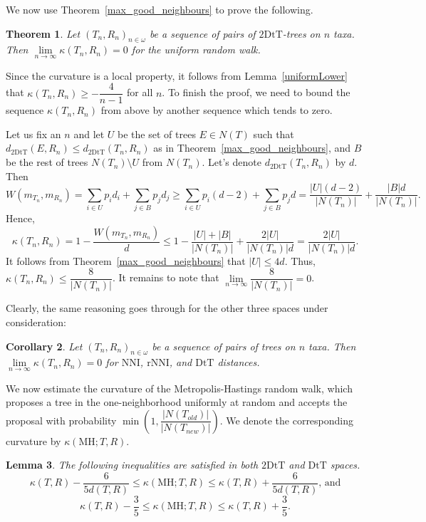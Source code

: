 \documentclass{amsart}
\newtheorem{lemma}{Lemma}
\newtheorem{corollary}[lemma]{Corollary}
\newtheorem{theorem}[lemma]{Theorem}
\theoremstyle{definition}
\newcommand{\dts}{\mathrm{2DtT}}
\newcommand{\nni}{\mathrm{NNI}}
\newcommand{\rnni}{\mathrm{rNNI}}
\newcommand{\mdts}{\mathrm{DtT}}
\newcommand{\MH}{\mathrm{MH}}
\begin{document}
We now use Theorem~\ref{max_good_neighbours} to prove the following.


\begin{theorem}\label{zero-in-the-limit}
Let $(T_n,R_n)_{n\in\omega}$ be a sequence of pairs of $\dts$-trees on $n$ taxa.
Then $\lim\limits_{n \to \infty}\kappa(T_n,R_n) = 0$ for the uniform random walk.
\end{theorem}

\proof
Since the curvature is a local property, it follows from Lemma~\ref{uniformLower} that $\kappa(T_n,R_n) \geq -\dfrac{4}{n-1}$ for all $n$.
To finish the proof, we need to bound the sequence $\kappa(T_n,R_n)$ from above by another sequence which tends to zero.

Let us fix an $n$ and let $U$ be the set of trees $E \in N(T)$ such that $d_\dts(E,R_n) \leq d_\dts(T_n,R_n)$ as in Theorem~\ref{max_good_neighbours}, and $B$ be the rest of trees $N(T_n)\setminus U$ from $N(T_n)$.
Let's denote $d_\dts(T_n,R_n)$ by $d$.
Then
\[
W(m_{T_n},m_{R_n}) = \sum_{i\in U} p_i d_i + \sum_{j\in B} p_j d_j \geq
\sum_{i\in U} p_i (d-2) + \sum_{j\in B} p_j d =
\frac{|U|(d-2)}{|N(T_n)|} + \frac{|B|d}{|N(T_n)|}.
\]
Hence,
\[
\kappa(T_n,R_n) = 1 - \frac{W(m_{T_n},m_{R_n})}{d} \leq
1 - \frac{|U| + |B|}{|N(T_n)|} + \frac{2|U|}{|N(T_n)|d}
= \frac{2|U|}{|N(T_n)|d}.
\]
It follows from Theorem~\ref{max_good_neighbours} that $|U| \leq 4d$.
Thus, $\kappa(T_n,R_n) \leq \dfrac{8}{|N(T_n)|}$.
It remains to note that $\lim\limits_{n\to\infty}\dfrac{8}{|N(T_n)|} = 0$.
\endproof

Clearly, the same reasoning goes through for the other three spaces under consideration:

\begin{corollary}
Let $(T_n,R_n)_{n\in\omega}$ be a sequence of pairs of trees on $n$ taxa.
Then $\lim\limits_{n \to \infty}\kappa(T_n,R_n) = 0$ for $\nni$, $\rnni$, and $\mdts$ distances.
\end{corollary}

We now estimate the curvature of the Metropolis-Hastings random walk, which proposes a tree in the one-neighborhood uniformly at random and accepts the proposal with probability $\min\left(1, \dfrac{|N(T_{old})|}{|N(T_{new})|}\right)$.
We denote the corresponding curvature by $\kappa(\MH;T,R)$.

\begin{lemma}
The following inequalities are satisfied in both $\dts$ and $\mdts$ spaces.
\[
\kappa(T,R) - \dfrac{6}{5d(T,R)} \leq \kappa(\MH;T,R) \leq \kappa(T,R) +
\dfrac{6}{5d(T,R)}\mbox{, and}
\]
\[
\kappa(T,R) - \dfrac35 \leq \kappa(\MH;T,R) \leq \kappa(T,R) + \dfrac35.
\]
\end{lemma}
\end{document}
